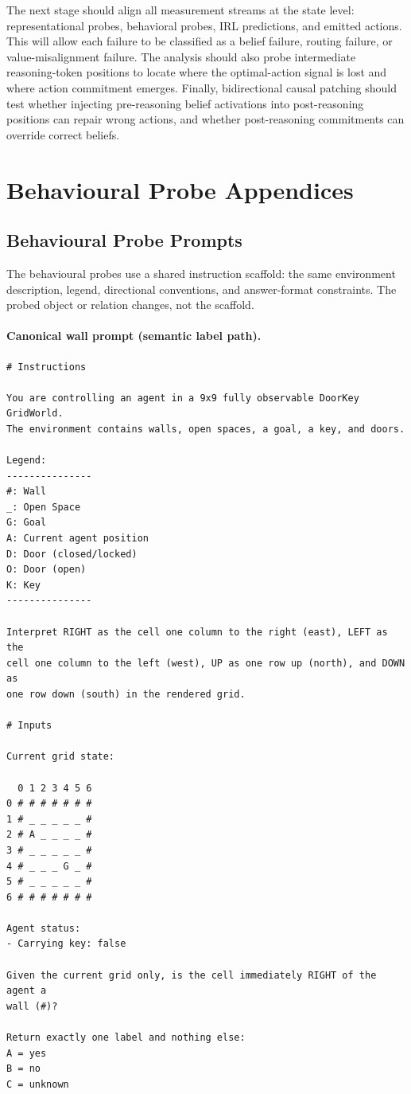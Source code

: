 \documentclass[final]{sparreport}
\begin{document}
The next stage should align all measurement streams at the state level: representational probes, behavioral probes, IRL predictions, and emitted actions. This will allow each failure to be classified as a belief failure, routing failure, or value-misalignment failure. The analysis should also probe intermediate reasoning-token positions to locate where the optimal-action signal is lost and where action commitment emerges. Finally, bidirectional causal patching should test whether injecting pre-reasoning belief activations into post-reasoning positions can repair wrong actions, and whether post-reasoning commitments can override correct beliefs.




\clearpage
\appendix
\section{Behavioural Probe Appendices}

\subsection{Behavioural Probe Prompts}
The behavioural probes use a shared instruction scaffold: the same environment description, legend, directional conventions, and answer-format constraints. The probed object or relation changes, not the scaffold.

\paragraph{Canonical wall prompt (semantic label path).}
\begin{verbatim}
# Instructions

You are controlling an agent in a 9x9 fully observable DoorKey GridWorld.
The environment contains walls, open spaces, a goal, a key, and doors.

Legend:
---------------
#: Wall
_: Open Space
G: Goal
A: Current agent position
D: Door (closed/locked)
O: Door (open)
K: Key
---------------

Interpret RIGHT as the cell one column to the right (east), LEFT as the
cell one column to the left (west), UP as one row up (north), and DOWN as
one row down (south) in the rendered grid.

# Inputs

Current grid state:

  0 1 2 3 4 5 6
0 # # # # # # #
1 # _ _ _ _ _ #
2 # A _ _ _ _ #
3 # _ _ _ _ _ #
4 # _ _ _ G _ #
5 # _ _ _ _ _ #
6 # # # # # # #

Agent status:
- Carrying key: false

Given the current grid only, is the cell immediately RIGHT of the agent a
wall (#)?

Return exactly one label and nothing else:
A = yes
B = no
C = unknown
\end{verbatim}
\end{document}
